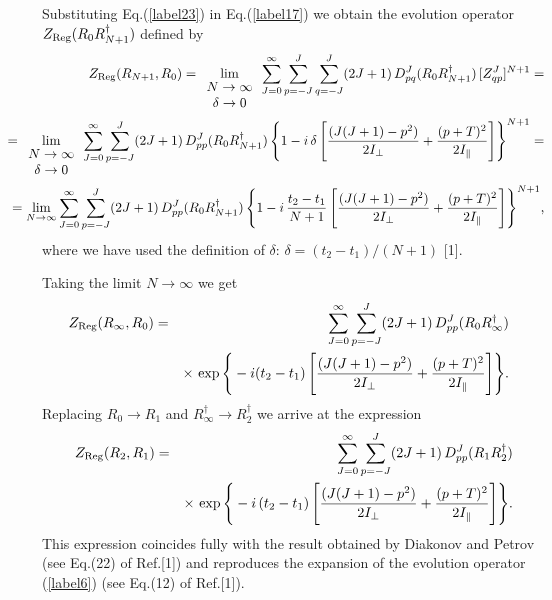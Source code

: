 \documentclass[a4paper,11pt]{article}
\begin{document}
Substituting Eq.(\ref{label23}) in Eq.(\ref{label17}) we obtain the
evolution operator $Z_{\rm Reg}(R_0R^{\dagger}_{N+1})$ defined by
%
\begin{eqnarray}\label{label24}
\hspace{-0.5in}&&Z_{\rm Reg}(R_{N+1},R_0) = \lim_{\begin{array}{c}
N\to \infty\\ \delta \to
0\end{array}}\sum^{\infty}_{J=0}\sum^{J}_{p=-J}\sum^{J}_{q=-J}(2J +
1)\,D^J_{pq}(R_0R^{\dagger}_{N+1})\,[Z^J_{qp}]^{N+1}=\nonumber\\
\hspace{-0.5in}&&=\lim_{\begin{array}{c} N\to \infty\\ \delta \to
0\end{array}}\sum^{\infty}_{J=0}\sum^{J}_{p = -J}(2J +
1)\,D^J_{pp}(R_0R^{\dagger}_{N+1})\,\Bigg\{1
-i\,\delta\,\Bigg[\frac{(J(J+1) - p^2)}{2I_{\perp}} + \frac{(p +
T)^2}{2I_{\parallel}}\Bigg]\Bigg\}^{N+1}=\nonumber\\
\hspace{-0.5in}&&=\lim_{N\to \infty}\sum^{\infty}_{J=0}\sum^{J}_{p =
-J}(2J + 1)\,D^J_{pp}(R_0R^{\dagger}_{N+1})\,\Bigg\{1
-i\,\frac{t_2-t_1}{N+1}\,\Bigg[\frac{(J(J+1) - p^2)}{2I_{\perp}} +
\frac{(p + T)^2}{2I_{\parallel}}\Bigg]\Bigg\}^{N+1},
\end{eqnarray}
%
where we have used the definition of $\delta$: $\delta = (t_2 -
t_1)/(N+1)$ [1].

Taking the limit $N\to \infty$ we get
%
\begin{eqnarray}\label{label25}
\hspace{-0.1in}Z_{\rm Reg}(R_{\infty},R_0) &=&  \sum^{\infty}_{J=0}
\sum^{J}_{p= -J}(2J +
1)\,D^J_{pp}(R_0R^{\dagger}_{\infty})\nonumber\\
&&\times\,\exp\Bigg\{-i(t_2-t_1)\,\Bigg[\frac{(J(J+1)
- p^2)}{2I_{\perp}} + \frac{(p + T)^2}{2I_{\parallel}}\Bigg]\Bigg\}.
\end{eqnarray}
%
Replacing $R_0 \to R_1$ and $R^{\dagger}_{\infty} \to R^{\dagger}_2$
we arrive at the expression 
%
\begin{eqnarray}\label{label26}
Z_{\rm Reg}(R_2,R_1) &=& \sum^{\infty}_{J=0}\sum^{J}_{p= -J}(2J +
1)\,D^J_{pp}(R_1R^{\dagger}_2)\nonumber\\
&&\times\,\exp\Bigg\{-i\,(t_2-t_1)\,
\Bigg[\frac{(J(J+1) - p^2)}{2I_{\perp}} + \frac{(p +
T)^2}{2I_{\parallel}}\Bigg]\Bigg\}.
\end{eqnarray}
%
This expression coincides fully with the result obtained by Diakonov
and Petrov (see Eq.(22) of Ref.[1]) and reproduces the expansion of
the evolution operator (\ref{label6}) (see Eq.(12) of
Ref.[1]).
\end{document}
